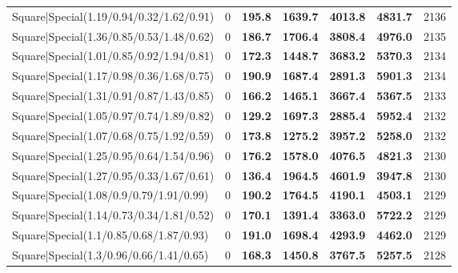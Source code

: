 \begin{tabular}{lrllllr}
 Square|Special(1.19/0.94/0.32/1.62/0.91)                      &             0   & \textbf{195.8} & \textbf{1639.7} & \textbf{4013.8} & \textbf{4831.7} &         2136 \\
 Square|Special(1.36/0.85/0.53/1.48/0.62)                      &             0   & \textbf{186.7} & \textbf{1706.4} & \textbf{3808.4} & \textbf{4976.0} &         2135 \\
 Square|Special(1.01/0.85/0.92/1.94/0.81)                      &             0   & \textbf{172.3} & \textbf{1448.7} & \textbf{3683.2} & \textbf{5370.3} &         2134 \\
 Square|Special(1.17/0.98/0.36/1.68/0.75)                      &             0   & \textbf{190.9} & \textbf{1687.4} & \textbf{2891.3} & \textbf{5901.3} &         2134 \\
 Square|Special(1.31/0.91/0.87/1.43/0.85)                      &             0   & \textbf{166.2} & \textbf{1465.1} & \textbf{3667.4} & \textbf{5367.5} &         2133 \\
 Square|Special(1.05/0.97/0.74/1.89/0.82)                      &             0   & \textbf{129.2} & \textbf{1697.3} & \textbf{2885.4} & \textbf{5952.4} &         2132 \\
 Square|Special(1.07/0.68/0.75/1.92/0.59)                      &             0   & \textbf{173.8} & \textbf{1275.2} & \textbf{3957.2} & \textbf{5258.0} &         2132 \\
 Square|Special(1.25/0.95/0.64/1.54/0.96)                      &             0   & \textbf{176.2} & \textbf{1578.0} & \textbf{4076.5} & \textbf{4821.3} &         2130 \\
 Square|Special(1.27/0.95/0.33/1.67/0.61)                      &             0   & \textbf{136.4} & \textbf{1964.5} & \textbf{4601.9} & \textbf{3947.8} &         2130 \\
 Square|Special(1.08/0.9/0.79/1.91/0.99)                       &             0   & \textbf{190.2} & \textbf{1764.5} & \textbf{4190.1} & \textbf{4503.1} &         2129 \\
 Square|Special(1.14/0.73/0.34/1.81/0.52)                      &             0   & \textbf{170.1} & \textbf{1391.4} & \textbf{3363.0} & \textbf{5722.2} &         2129 \\
 Square|Special(1.1/0.85/0.68/1.87/0.93)                       &             0   & \textbf{191.0} & \textbf{1698.4} & \textbf{4293.9} & \textbf{4462.0} &         2129 \\
 Square|Special(1.3/0.96/0.66/1.41/0.65)                       &             0   & \textbf{168.3} & \textbf{1450.8} & \textbf{3767.5} & \textbf{5257.5} &         2128 \\

\end{tabular}
